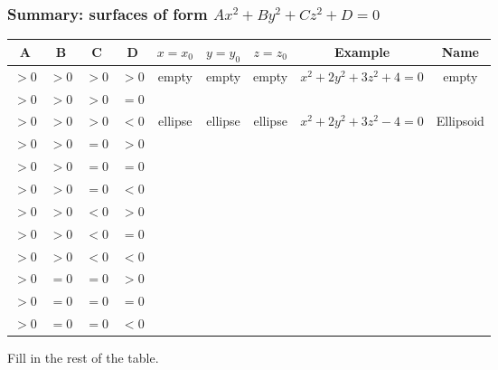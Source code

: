 \begin{frame}
\frametitle{Summary: surfaces of form $Ax^2+By^2+Cz^2+D=0$}
\tiny
\begin{tabular}{|c|c|c|c|c|c|c|c|c|}
\hline
A & B & C & D & $x=x_0$ & $y=y_0$ & $z=z_0$ & Example & Name
\\\hline
$>0$ & $>0$ & $>0$ & $>0$ & empty & empty & empty & $x^2+2y^2+3z^2+4=0$ & empty \\
\hline
$>0$ & $>0$ & $>0$ & $=0$ &  &  &  &  &  \\
\hline
$>0$ & $>0$ & $>0$ & $<0$ & ellipse & ellipse & ellipse & $x^2+2y^2+3z^2-4=0$ & Ellipsoid \\
\hline
$>0$ & $>0$ & $=0$ & $>0$ &  &  &  &  &  \\
\hline
$>0$ & $>0$ & $=0$ & $=0$ &  &  &  &  &  \\
\hline
$>0$ & $>0$ & $=0$ & $<0$ &  &  &  &  &  \\
\hline
$>0$ & $>0$ & $<0$ & $>0$ &  &  &  &  &  \\
\hline
$>0$ & $>0$ & $<0$ & $=0$ &  &  &  &  &  \\
\hline
$>0$ & $>0$ & $<0$ & $<0$ &  &  &  &  &  \\
\hline
$>0$ & $=0$ & $=0$ & $>0$ &  &  &  &  &  \\
\hline
$>0$ & $=0$ & $=0$ & $=0$ &  &  &  &  &  \\
\hline
$>0$ & $=0$ & $=0$ & $<0$ &  &  &  &  &  \\
\hline
\end{tabular}

Fill in the rest of the table.
\end{frame}
